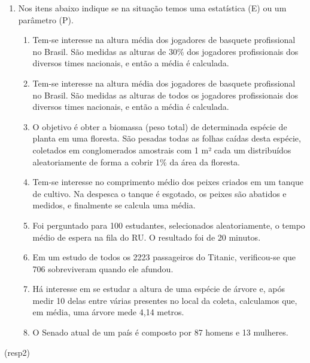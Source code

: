 \documentclass[]{article}
\newenvironment{Shaded}{\begin{snugshade}}{\end{snugshade}}
\newcommand{\NormalTok}[1]{#1}
\providecommand{\tightlist}{%
  \setlength{\itemsep}{0pt}\setlength{\parskip}{0pt}}
\begin{document}
\begin{enumerate}
\def\labelenumi{\arabic{enumi}.}
\setcounter{enumi}{1}
\tightlist
\item
  Nos itens abaixo indique se na situação temos uma estatística (E) ou
  um parâmetro (P).

  \begin{enumerate}
  \def\labelenumii{(\alph{enumii})}
  \tightlist
  \item
    Tem-se interesse na altura média dos jogadores de basquete
    profissional no Brasil. São medidas as alturas de 30\% dos jogadores
    profissionais dos diversos times nacionais, e então a média é
    calculada.
  \item
    Tem-se interesse na altura média dos jogadores de basquete
    profissional no Brasil. São medidas as alturas de todos os jogadores
    profissionais dos diversos times nacionais, e então a média é
    calculada.
  \item
    O objetivo é obter a biomassa (peso total) de determinada espécie de
    planta em uma floresta. São pesadas todas as folhas caídas desta
    espécie, coletados em conglomerados amostrais com 1 m² cada um
    distribuídos aleatoriamente de forma a cobrir 1\% da área da
    floresta.
  \item
    Tem-se interesse no comprimento médio dos peixes criados em um
    tanque de cultivo. Na despesca o tanque é esgotado, os peixes são
    abatidos e medidos, e finalmente se calcula uma média.
  \item
    Foi perguntado para 100 estudantes, selecionados aleatoriamente, o
    tempo médio de espera na fila do RU. O resultado foi de 20 minutos.
  \item
    Em um estudo de todos os 2223 passageiros do Titanic, verificou-se
    que 706 sobreviveram quando ele afundou.
  \item
    Há interesse em se estudar a altura de uma espécie de árvore e, após
    medir 10 delas entre várias presentes no local da coleta, calculamos
    que, em média, uma árvore mede 4,14 metros.
  \item
    O Senado atual de um país é composto por 87 homens e 13 mulheres.
  \end{enumerate}
\end{enumerate}

\begin{Shaded}
\begin{Highlighting}[]
\NormalTok{(resp2)}
\end{Highlighting}
\end{Shaded}
\end{document}
